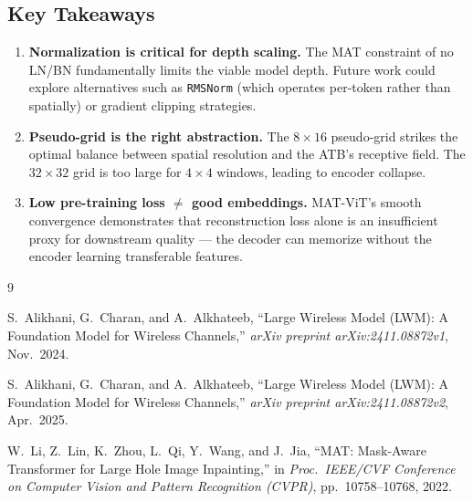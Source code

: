 \documentclass[12pt,a4paper]{article}
\begin{document}
\subsection{Key Takeaways}\label{subsec:fail_lessons}

\begin{enumerate}
    \item \textbf{Normalization is critical for depth scaling.} The MAT constraint of no LN/BN fundamentally limits the viable model depth. Future work could explore alternatives such as \texttt{RMSNorm} (which operates per-token rather than spatially) or gradient clipping strategies.

    \item \textbf{Pseudo-grid is the right abstraction.} The $8{\times}16$ pseudo-grid strikes the optimal balance between spatial resolution and the ATB's receptive field. The $32{\times}32$ grid is too large for $4{\times}4$ windows, leading to encoder collapse.

    \item \textbf{Low pre-training loss $\neq$ good embeddings.} MAT-ViT's smooth convergence demonstrates that reconstruction loss alone is an insufficient proxy for downstream quality --- the decoder can memorize without the encoder learning transferable features.
\end{enumerate}

\newpage
\begin{thebibliography}{9}

S.~Alikhani, G.~Charan, and A.~Alkhateeb,
``Large Wireless Model (LWM): A Foundation Model for Wireless Channels,''
\textit{arXiv preprint arXiv:2411.08872v1}, Nov.~2024.

S.~Alikhani, G.~Charan, and A.~Alkhateeb,
``Large Wireless Model (LWM): A Foundation Model for Wireless Channels,''
\textit{arXiv preprint arXiv:2411.08872v2}, Apr.~2025.

W.~Li, Z.~Lin, K.~Zhou, L.~Qi, Y.~Wang, and J.~Jia,
``MAT: Mask-Aware Transformer for Large Hole Image Inpainting,''
in \textit{Proc.\ IEEE/CVF Conference on Computer Vision and Pattern Recognition (CVPR)}, pp.~10758--10768, 2022.

\end{thebibliography}
\end{document}
